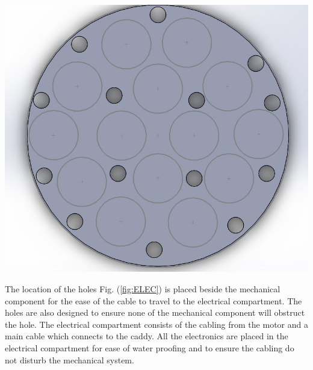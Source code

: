\documentclass[11pt,landscape]{article}
\newenvironment{Figure}
  {\par\medskip\noindent\minipage{\linewidth}}
  {\endminipage\par\medskip}
\begin{document}
\begin{multicols}{3}
    \begin{Figure}
        \begin{center}
            \includegraphics[width=\textwidth]{Figure9.jpg}
            \label{fig:ELEC}
        \end{center}
    \end{Figure}

    The location of the holes Fig. (\ref{fig:ELEC}) is placed beside the
    mechanical component for the ease of the cable to travel to the electrical
    compartment. The holes are also designed to ensure none of the mechanical
    component will obstruct the hole. The electrical compartment consists of the
    cabling from the motor and a main cable which connects to the caddy. All the
    electronics are placed in the electrical compartment for ease of water
    proofing and to ensure the cabling do not disturb the mechanical system. 
    

\end{multicols}
\end{document}
